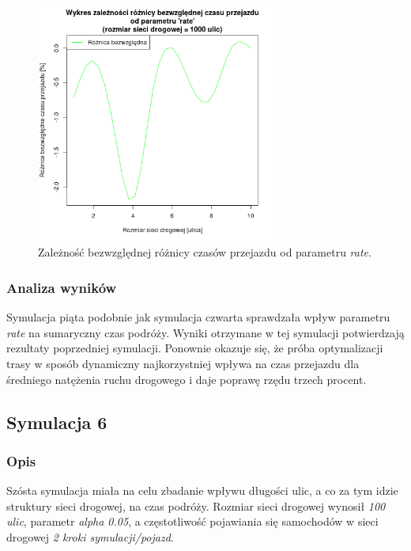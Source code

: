 \documentclass[11pt,a4paper]{article}
\begin{document}
\begin{figure}[H]
	\centering
		\includegraphics[width=0.7\textwidth]{../images/simulation5_diff}
	\caption{Zależność bezwzględnej różnicy czasów przejazdu od parametru \textit{rate}.}
\end{figure}

\subsubsection{Analiza wyników}

Symulacja piąta podobnie jak symulacja czwarta sprawdzała wpływ parametru \textit{rate} na sumaryczny czas podróży. Wyniki otrzymane w tej symulacji potwierdzają rezultaty poprzedniej symulacji. Ponownie okazuje się, że próba optymalizacji trasy w sposób dynamiczny najkorzystniej wpływa na czas przejazdu dla średniego natężenia ruchu drogowego i daje poprawę rzędu trzech procent.

\subsection{Symulacja 6}

\subsubsection{Opis}

Szósta symulacja miała na celu zbadanie wpływu długości ulic, a co za tym idzie struktury sieci drogowej, na czas podróży. Rozmiar sieci drogowej wynosił \textit{100 ulic}, parametr \textit{alpha 0.05}, a częstotliwość pojawiania się samochodów w sieci drogowej \textit{2 kroki symulacji/pojazd}.
\end{document}
